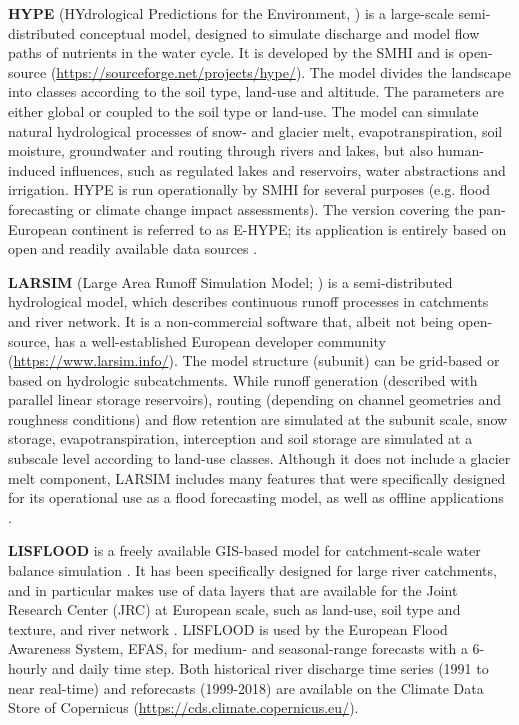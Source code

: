 \documentclass[10pt,a4paper]{article}
\begin{document}
\textbf{HYPE} (HYdrological Predictions for the Environment, \citealp{Lindstrom2010}) is a large-scale semi-distributed conceptual model, designed to simulate discharge and model flow paths of nutrients in the water cycle. It is developed by the SMHI and is open-source (\url{https://sourceforge.net/projects/hype/}). The model divides the landscape into classes according to the soil type, land-use and altitude. The parameters are either global or coupled to the soil type or land-use. The model can simulate natural hydrological processes of snow- and glacier melt, evapotranspiration, soil moisture, groundwater and routing through rivers and lakes, but also human-induced influences, such as regulated lakes and reservoirs, water abstractions and irrigation. HYPE is run operationally by SMHI for several purposes (e.g. flood forecasting or climate change impact assessments). The version covering the pan-European continent is referred to as E-HYPE; its application is entirely based on open and readily available data sources \citep[][ \url{https://hypeweb.smhi.se/explore-water/geographical-domains/\#europehype}]{Donnelly2015}.

\textbf{LARSIM} (Large Area Runoff Simulation Model; \citealp{Ludwig2006}) is a semi-distributed hydrological model, which describes continuous runoff processes in catchments and river network. It is a non-commercial software that, albeit not being open-source, has a well-established European developer community (\url{https://www.larsim.info/}). The model structure (subunit) can be grid-based or based on hydrologic subcatchments. While runoff generation (described with parallel linear storage reservoirs), routing (depending on channel geometries and roughness conditions) and flow retention are simulated at the subunit scale, snow storage, evapotranspiration, interception and soil storage are simulated at a subscale level according to land-use classes. Although it does not include a glacier melt component, LARSIM includes many features that were specifically designed for its operational use as a flood forecasting model, as well as offline applications \citep{Stahl2017}. 

\textbf{LISFLOOD} is a freely available GIS-based model for catchment-scale water balance simulation \citep[][\url{https://ec-jrc.github.io/lisflood-model/}]{vanDerKniff2010}. It has been specifically designed for large river catchments, and in particular makes use of data layers that are available for the Joint Research Center (JRC) at European scale, such as land-use, soil type and texture, and river network \citep{Thielen2009}. LISFLOOD is used by the European Flood Awareness System, EFAS, for medium- and seasonal-range forecasts with a 6-hourly and daily time step. Both historical river discharge time series (1991 to near real-time) and reforecasts (1999-2018) are available on the Climate Data Store of Copernicus (\url{https://cds.climate.copernicus.eu/}). 
\end{document}
